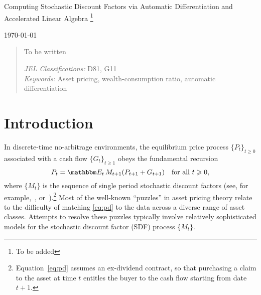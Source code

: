 \documentclass[12pt, reqno]{amsart}
\renewcommand{\geq}{\geqslant}
\newcommand\blfootnote[1]{%
  \begingroup
  \renewcommand\thefootnote{}\footnote{#1}%
  \addtocounter{footnote}{-1}%
  \endgroup
}
\newcommand{\1}{\mathbbm 1}
\newcommand{\EE}{\mathbbm E}
\theoremstyle{plain}
\theoremstyle{definition}
\begin{document}
\title{}




\begin{center}
    \LARGE 
    Computing Stochastic Discount Factors via Automatic Differentiation and
    Accelerated Linear Algebra
    \blfootnote{To be added}
 
    \vspace{1em}



    \normalsize
    \today
\end{center}


\begin{abstract}
    To be written
    \vspace{1em}

    \noindent
    \textit{JEL Classifications:} D81, G11 \\
    \textit{Keywords:} Asset pricing, wealth-consumption ratio, automatic differentiation
\end{abstract}





\maketitle


\section{Introduction}

In discrete-time no-arbitrage environments, the equilibrium price process
$\{P_t\}_{t \geq 0}$ associated with a cash flow $\{G_t\}_{t \geq 1}$ obeys
the fundamental recursion
%
\begin{equation}
    \label{eq:pd}
    P_t
    = \EE_t \, M_{t+1} ( P_{t+1} + G_{t+1} )
    \quad \text{for all } t \geq 0,
\end{equation}
%
where $\{ M_t\}$ is the sequence of single period stochastic discount factors
(see, for example,~\cite{kreps1981arbitrage}, \cite{hansen_richard:1987}
or~\cite{duffie2001dynamic}).\footnote{Equation~\eqref{eq:pd} assumes an
    ex-dividend contract, so that purchasing a claim to the asset at time $t$
entitles the buyer to the cash flow starting from date $t+1$.}  Most of the
well-known ``puzzles'' in asset pricing theory relate to the difficulty of
matching \eqref{eq:pd} to the data across a diverse range of asset classes.
Attempts to resolve these puzzles typically involve relatively sophisticated
models for the stochastic discount factor (SDF) process $\{ M_t\}$.
\end{document}
